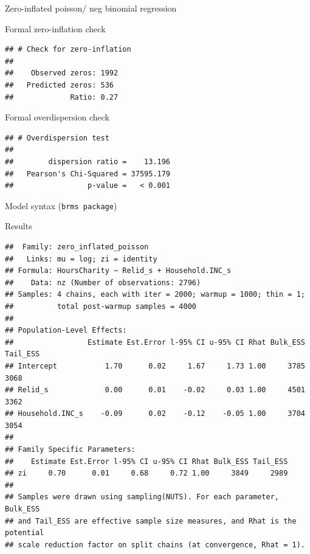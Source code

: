 \documentclass[
  ignorenonframetext,
]{beamer}
\begin{document}
\begin{frame}[fragile]{Zero-inflated poisson/ neg binomial regression}
\begin{block}{Formal zero-inflation check}
\protect\hypertarget{formal-zero-inflation-check}{}
\begin{verbatim}
## # Check for zero-inflation
## 
##    Observed zeros: 1992
##   Predicted zeros: 536
##             Ratio: 0.27
\end{verbatim}
\end{block}

\begin{block}{Formal overdispersion check}
\protect\hypertarget{formal-overdispersion-check}{}
\begin{verbatim}
## # Overdispersion test
## 
##        dispersion ratio =    13.196
##   Pearson's Chi-Squared = 37595.179
##                 p-value =   < 0.001
\end{verbatim}
\end{block}

\begin{block}{Model syntax (\texttt{brms\ package})}
\protect\hypertarget{model-syntax-brms-package}{}
\end{block}

\begin{block}{Results}
\protect\hypertarget{results-3}{}
\begin{verbatim}
##  Family: zero_inflated_poisson 
##   Links: mu = log; zi = identity 
## Formula: HoursCharity ~ Relid_s + Household.INC_s 
##    Data: nz (Number of observations: 2796) 
## Samples: 4 chains, each with iter = 2000; warmup = 1000; thin = 1;
##          total post-warmup samples = 4000
## 
## Population-Level Effects: 
##                 Estimate Est.Error l-95% CI u-95% CI Rhat Bulk_ESS Tail_ESS
## Intercept           1.70      0.02     1.67     1.73 1.00     3785     3068
## Relid_s             0.00      0.01    -0.02     0.03 1.00     4501     3362
## Household.INC_s    -0.09      0.02    -0.12    -0.05 1.00     3704     3054
## 
## Family Specific Parameters: 
##    Estimate Est.Error l-95% CI u-95% CI Rhat Bulk_ESS Tail_ESS
## zi     0.70      0.01     0.68     0.72 1.00     3849     2989
## 
## Samples were drawn using sampling(NUTS). For each parameter, Bulk_ESS
## and Tail_ESS are effective sample size measures, and Rhat is the potential
## scale reduction factor on split chains (at convergence, Rhat = 1).
\end{verbatim}
\end{block}


\end{frame}
\end{document}
